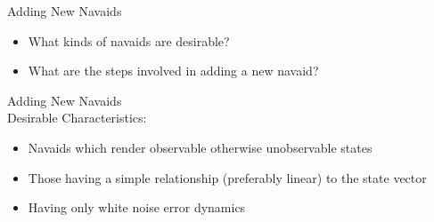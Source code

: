 \begin{frame}
Adding New Navaids
 \begin{itemize}
 \item What kinds of navaids are desirable?
 \item What are the steps involved in adding a new navaid?
\end{itemize}
\end{frame}
\begin{frame}
Adding New Navaids\\
Desirable Characteristics:
\begin{itemize}
  \item Navaids which render observable otherwise unobservable states
  \item Those having a simple relationship (preferably linear) to the state vector
  \item Having only white noise error dynamics
\end{itemize} 
\end{frame}

